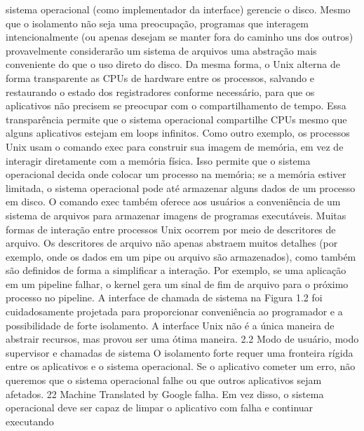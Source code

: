 sistema  operacional  (como  implementador  da  interface)  gerencie  o  disco.  Mesmo  que  o  isolamento  não  seja  uma  
preocupação,  programas  que  interagem  intencionalmente  (ou  apenas  desejam  se  manter  fora  do  caminho  uns  dos  outros)  
provavelmente  considerarão  um  sistema  de  arquivos  uma  abstração  mais  conveniente  do  que  o  uso  direto  do  disco.
 Da  mesma  forma,  o  Unix  alterna  de  forma  transparente  as  CPUs  de  hardware  entre  os  processos,  salvando  e  restaurando  
o  estado  dos  registradores  conforme  necessário,  para  que  os  aplicativos  não  precisem  se  preocupar  com  o  compartilhamento  de  
tempo.  Essa  transparência  permite  que  o  sistema  operacional  compartilhe  CPUs  mesmo  que  alguns  aplicativos  estejam  em  loops  
infinitos.
 Como  outro  exemplo,  os  processos  Unix  usam  o  comando  exec  para  construir  sua  imagem  de  memória,  em  vez  de  interagir  
diretamente  com  a  memória  física.  Isso  permite  que  o  sistema  operacional  decida  onde  colocar  um  processo  na  memória;  se  a  
memória  estiver  limitada,  o  sistema  operacional  pode  até  armazenar  alguns  dados  de  um  processo  em  disco.  O  comando  exec  
também  oferece  aos  usuários  a  conveniência  de  um  sistema  de  arquivos  para  armazenar  imagens  de  programas  executáveis.
 Muitas  formas  de  interação  entre  processos  Unix  ocorrem  por  meio  de  descritores  de  arquivo.  Os  descritores  de  arquivo  não  
apenas  abstraem  muitos  detalhes  (por  exemplo,  onde  os  dados  em  um  pipe  ou  arquivo  são  armazenados),  como  também  são  
definidos  de  forma  a  simplificar  a  interação.  Por  exemplo,  se  uma  aplicação  em  um  pipeline  falhar,  o  kernel  gera  um  sinal  de  fim  
de  arquivo  para  o  próximo  processo  no  pipeline.
 A  interface  de  chamada  de  sistema  na  Figura  1.2  foi  cuidadosamente  projetada  para  proporcionar  conveniência  ao  
programador  e  a  possibilidade  de  forte  isolamento.  A  interface  Unix  não  é  a  única  maneira  de  abstrair  recursos,  mas  provou  ser  
uma  ótima  maneira.
 2.2  Modo  de  usuário,  modo  supervisor  e  chamadas  de  sistema
 O  isolamento  forte  requer  uma  fronteira  rígida  entre  os  aplicativos  e  o  sistema  operacional.  Se  o  aplicativo  cometer  um  erro,  não  
queremos  que  o  sistema  operacional  falhe  ou  que  outros  aplicativos  sejam  afetados.
 22
Machine Translated by Google
 falha.  Em  vez  disso,  o  sistema  operacional  deve  ser  capaz  de  limpar  o  aplicativo  com  falha  e  continuar  executando  
